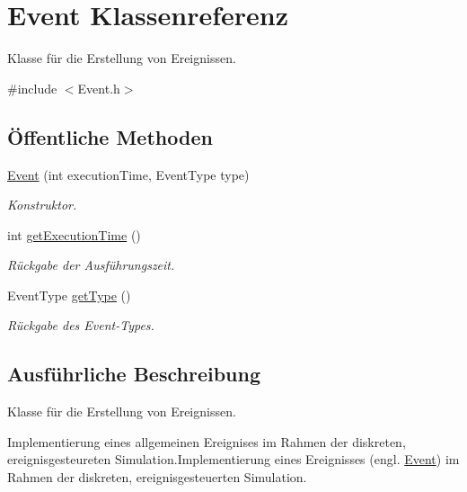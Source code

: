 \hypertarget{classEvent}{}\section{Event Klassenreferenz}
\label{classEvent}


Klasse für die Erstellung von Ereignissen.  




{\ttfamily \#include $<$Event.\+h$>$}

\subsection*{Öffentliche Methoden}
\begin{DoxyCompactItemize}
\item 
\hyperlink{classEvent_ac7422ad6f411427e4d51cde6bcc51572}{Event} (int execution\+Time, Event\+Type type)
\begin{DoxyCompactList}\small\item\em Konstruktor. \end{DoxyCompactList}\item 
int \hyperlink{classEvent_aa96b4d982f3330662aa94a03c2aa9df3}{get\+Execution\+Time} ()\hypertarget{classEvent_aa96b4d982f3330662aa94a03c2aa9df3}{}\label{classEvent_aa96b4d982f3330662aa94a03c2aa9df3}

\begin{DoxyCompactList}\small\item\em Rückgabe der Ausführungszeit. \end{DoxyCompactList}\item 
Event\+Type \hyperlink{classEvent_aceb1ddcf030da7877ab5c4bf38afb1dc}{get\+Type} ()\hypertarget{classEvent_aceb1ddcf030da7877ab5c4bf38afb1dc}{}\label{classEvent_aceb1ddcf030da7877ab5c4bf38afb1dc}

\begin{DoxyCompactList}\small\item\em Rückgabe des Event-\/\+Types. \end{DoxyCompactList}\end{DoxyCompactItemize}


\subsection{Ausführliche Beschreibung}
Klasse für die Erstellung von Ereignissen. 

Implementierung eines allgemeinen Ereignises im Rahmen der diskreten, ereignisgesteureten Simulation.\+Implementierung eines Ereignisses (engl. \hyperlink{classEvent}{Event}) im Rahmen der diskreten, ereignisgesteuerten Simulation. 


